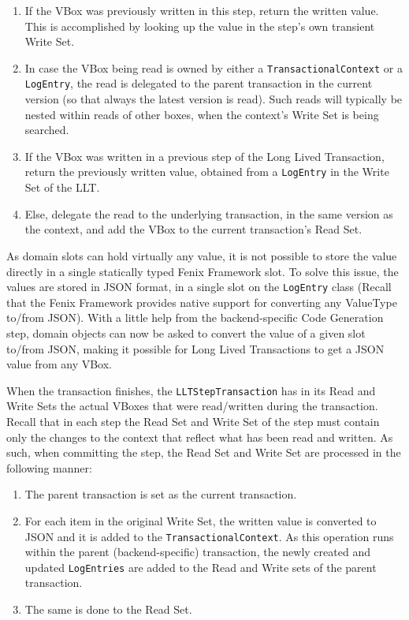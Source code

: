 \documentclass{llncs}
\begin{document}
\begin{enumerate}

\item If the VBox was previously written in this step, return the
  written value. This is accomplished by looking up the value in the
  step's own transient Write Set.

\item In case the VBox being read is owned by either a
  \texttt{TransactionalContext} or a \texttt{LogEntry}, the read is
  delegated to the parent transaction in the current version (so that
  always the latest version is read). Such reads will typically be
  nested within reads of other boxes, when the context's Write Set is
  being searched.

\item If the VBox was written in a previous step of the Long Lived
  Transaction, return the previously written value, obtained from a
  \texttt{LogEntry} in the Write Set of the LLT.

\item Else, delegate the read to the underlying transaction, in the
  same version as the context, and add the VBox to the current
  transaction's Read Set.

\end{enumerate}

As domain slots can hold virtually any value, it is not possible to
store the value directly in a single statically typed Fenix Framework
slot. To solve this issue, the values are stored in JSON format, in a
single slot on the \texttt{LogEntry} class (Recall that the Fenix
Framework provides native support for converting any ValueType to/from
JSON). With a little help from the backend-specific Code Generation
step, domain objects can now be asked to convert the value of a given
slot to/from JSON, making it possible for Long Lived Transactions to
get a JSON value from any VBox.

When the transaction finishes, the \texttt{LLTStepTransaction} has in
its Read and Write Sets the actual VBoxes that were read/written
during the transaction. Recall that in each step the Read Set and
Write Set of the step must contain only the changes to the context
that reflect what has been read and written. As such, when committing
the step, the Read Set and Write Set are processed in the following
manner:

\begin{enumerate}

\item The parent transaction is set as the current transaction.

\item For each item in the original Write Set, the written value is
  converted to JSON and it is added to the
  \texttt{TransactionalContext}. As this operation runs within the
  parent (backend-specific) transaction, the newly created and updated
  \texttt{LogEntries} are added to the Read and Write sets of the
  parent transaction.

\item The same is done to the Read Set.

\end{enumerate}
\end{document}
